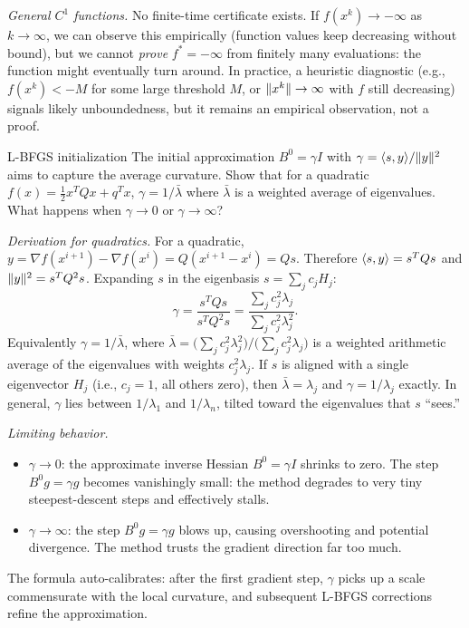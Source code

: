 \textit{General $C^1$ functions.}
No finite-time certificate exists.
If $f(x^k) \to -\infty$ as $k \to \infty$, we can observe this empirically (function values keep decreasing without bound), but we cannot \emph{prove} $f^* = -\infty$ from finitely many evaluations: the function might eventually turn around.
In practice, a heuristic diagnostic (e.g., $f(x^k) < -M$ for some large threshold $M$, or $\lVert x^k\rVert \to \infty$ with $f$ still decreasing) signals likely unboundedness, but it remains an empirical observation, not a proof.

\begin{exercise}{L-BFGS initialization}\label{ex:bfgs-initial}
	The initial approximation $B^0 = \gamma I$ with $\gamma = \langle s, y\rangle/\lVert y\rVert^2$ aims to capture the average curvature.
	Show that for a quadratic $f(x) = \frac{1}{2} x^T Q x + q^T x$, $\gamma = 1/\bar{\lambda}$ where $\bar{\lambda}$ is a weighted average of eigenvalues.
	What happens when $\gamma \to 0$ or $\gamma \to \infty$?
\end{exercise}

\solution
\textit{Derivation for quadratics.}
For a quadratic, $y = \nabla f(x^{i+1}) - \nabla f(x^i) = Q(x^{i+1} - x^i) = Qs$.
Therefore $\langle s, y\rangle = s^T Q s$ and $\lVert y\rVert^2 = s^T Q^2 s$.
Expanding $s$ in the eigenbasis $s = \sum_j c_j H_j$:
\begin{equation}\label{eq:ex-lbfgs-gamma}
	\gamma = \frac{s^T Q s}{s^T Q^2 s} = \frac{\sum_j c_j^2 \lambda_j}{\sum_j c_j^2 \lambda_j^2}.
\end{equation}
Equivalently $\gamma = 1/\bar{\lambda}$, where $\bar{\lambda} = \bigl(\sum_j c_j^2 \lambda_j^2\bigr) / \bigl(\sum_j c_j^2 \lambda_j\bigr)$ is a weighted arithmetic average of the eigenvalues with weights $c_j^2 \lambda_j$.
If $s$ is aligned with a single eigenvector $H_j$ (i.e., $c_j = 1$, all others zero), then $\bar{\lambda} = \lambda_j$ and $\gamma = 1/\lambda_j$ exactly.
In general, $\gamma$ lies between $1/\lambda_1$ and $1/\lambda_n$, tilted toward the eigenvalues that $s$ ``sees.''

\textit{Limiting behavior.}
\begin{itemize}
	\item $\gamma \to 0$: the approximate inverse Hessian $B^0 = \gamma I$ shrinks to zero. The step $B^0 g = \gamma g$ becomes vanishingly small: the method degrades to very tiny steepest-descent steps and effectively stalls.
	\item $\gamma \to \infty$: the step $B^0 g = \gamma g$ blows up, causing overshooting and potential divergence. The method trusts the gradient direction far too much.
\end{itemize}
The formula auto-calibrates: after the first gradient step, $\gamma$ picks up a scale commensurate with the local curvature, and subsequent L-BFGS corrections refine the approximation.

